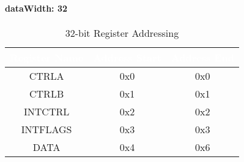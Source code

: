   \paragraph{dataWidth: 32}
  \begin{table}[H]
    \centering
    \begin{tabular}{|c|c|c|}
      \hline
      \rowcolor{darkgray}  %
      \textcolor{white}{\textbf{Register Name}} & \textcolor{white}{\textbf{Address Start}} & \textcolor{white}{\textbf{Address End}} \\ \hline
      CTRLA & 0x0 & 0x0 \\ \hline
      CTRLB & 0x1 & 0x1 \\ \hline
      INTCTRL & 0x2 & 0x2 \\ \hline
      INTFLAGS & 0x3 & 0x3 \\ \hline
      DATA & 0x4 & 0x6 \\ \hline
    \end{tabular}
    \caption{32-bit Register Addressing}
  \end{table}